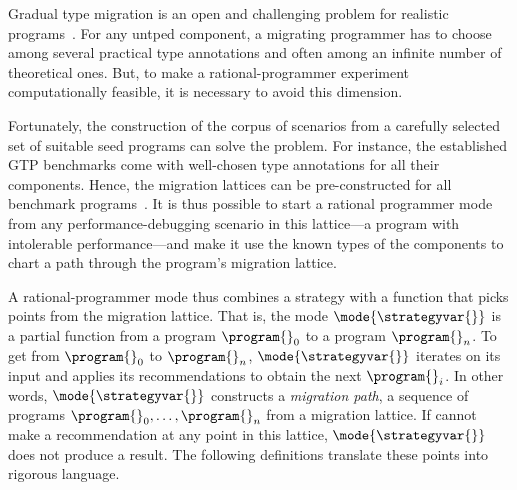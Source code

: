
Gradual type migration is an open and challenging problem for realistic
programs~\cite{rch:in-out-infer-gt, km:ts-type-evo,
mp:gt-decidable, ccew:gt-migrate, gc:gt-infer,
cagg-solver-based-migration,clps-popl-2020,js-infer,ruby-static-infer,unif-infer,
msi:gt-infer-hm,dyn-infer-ruby,profile-guided-typing,jstrace,gen-ts-decl,
lambdanet,nl2ptype,learn-types-big-data,ml-ts}. For
any untped component, a migrating programmer has to choose among several
practical type annotations and often among an infinite number of theoretical
ones. But, to make a rational-programmer experiment computationally feasible, it
is necessary to avoid this dimension.

Fortunately, the construction of the corpus of scenarios 
from a carefully selected set of suitable seed programs can solve the
problem. For instance, the established
GTP benchmarks come with well-chosen type annotations for all
their components.  Hence, the migration lattices can be pre-constructed for all
benchmark programs~\citep{tfgnvf-popl-2016}.  It is thus possible to start a
rational programmer mode from any performance-debugging scenario in this
lattice---a program with intolerable performance---and make it use the known
types of the components to chart a path through the program's migration lattice.

A rational-programmer mode thus combines a strategy \strategyvar{} with a
function that picks points from the migration lattice. That is, the mode
$\mode{\strategyvar{}}$ is a partial function from a program $\program{}_0$ to a
program $\program{}_n$. To get from $\program{}_0$ to $\program{}_n$,
$\mode{\strategyvar{}}$ iterates \strategyvar{} on its input and applies its
recommendations to obtain the next $\program{}_i$.  In other words, $\mode{\strategyvar{}}$
constructs a \emph{migration path}, a sequence of programs ${\program{}_0},
\ldots, {\program{}_n}$ from a migration lattice. If \strategyvar{} cannot make
a recommendation at any point in this lattice, $\mode{\strategyvar{}}$ does not
produce a result. The following definitions translate these points into rigorous
language. 


